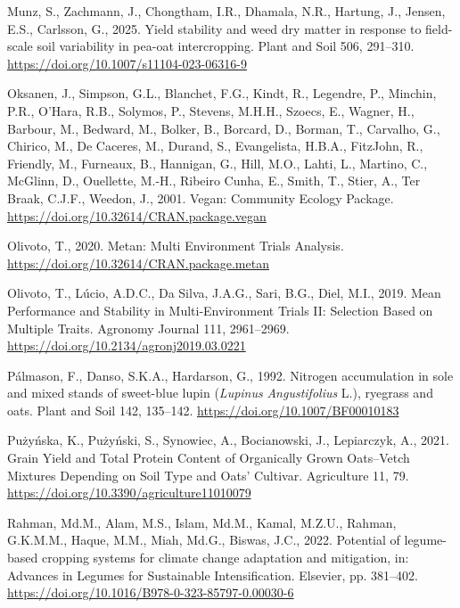 \documentclass[
  british,
  a4paper,
  DIV=11,
  numbers=noendperiod]{scrreprt}
\newlength{\cslhangindent}
\newenvironment{CSLReferences}[2] %
 {\begin{list}{}{%
  \setlength{\itemindent}{0pt}
  \setlength{\leftmargin}{0pt}
  \setlength{\parsep}{0pt}
  \ifodd #1
   \setlength{\leftmargin}{\cslhangindent}
   \setlength{\itemindent}{-1\cslhangindent}
  \fi
  \setlength{\itemsep}{#2\baselineskip}}}
 {\end{list}}
\begin{document}
\begin{CSLReferences}{1}{0}
Munz, S., Zachmann, J., Chongtham, I.R., Dhamala, N.R., Hartung, J.,
Jensen, E.S., Carlsson, G., 2025. Yield stability and weed dry matter in
response to field-scale soil variability in pea-oat intercropping. Plant
and Soil 506, 291--310. \url{https://doi.org/10.1007/s11104-023-06316-9}

Oksanen, J., Simpson, G.L., Blanchet, F.G., Kindt, R., Legendre, P.,
Minchin, P.R., O'Hara, R.B., Solymos, P., Stevens, M.H.H., Szoecs, E.,
Wagner, H., Barbour, M., Bedward, M., Bolker, B., Borcard, D., Borman,
T., Carvalho, G., Chirico, M., De Caceres, M., Durand, S., Evangelista,
H.B.A., FitzJohn, R., Friendly, M., Furneaux, B., Hannigan, G., Hill,
M.O., Lahti, L., Martino, C., McGlinn, D., Ouellette, M.-H., Ribeiro
Cunha, E., Smith, T., Stier, A., Ter Braak, C.J.F., Weedon, J., 2001.
Vegan: {Community Ecology Package}.
\url{https://doi.org/10.32614/CRAN.package.vegan}

Olivoto, T., 2020. Metan: {Multi Environment Trials Analysis}.
\url{https://doi.org/10.32614/CRAN.package.metan}

Olivoto, T., Lúcio, A.D.C., Da Silva, J.A.G., Sari, B.G., Diel, M.I.,
2019. Mean {Performance} and {Stability} in {Multi}-{Environment Trials
II}: {Selection Based} on {Multiple Traits}. Agronomy Journal 111,
2961--2969. \url{https://doi.org/10.2134/agronj2019.03.0221}

Pálmason, F., Danso, S.K.A., Hardarson, G., 1992. Nitrogen accumulation
in sole and mixed stands of sweet-blue lupin ({\emph{Lupinus}}{
\emph{Angustifolius}} {L}.), ryegrass and oats. Plant and Soil 142,
135--142. \url{https://doi.org/10.1007/BF00010183}

Pużyńska, K., Pużyński, S., Synowiec, A., Bocianowski, J., Lepiarczyk,
A., 2021. Grain {Yield} and {Total Protein Content} of {Organically
Grown Oats}--{Vetch Mixtures Depending} on {Soil Type} and {Oats}'
{Cultivar}. Agriculture 11, 79.
\url{https://doi.org/10.3390/agriculture11010079}

Rahman, Md.M., Alam, M.S., Islam, Md.M., Kamal, M.Z.U., Rahman,
G.K.M.M., Haque, M.M., Miah, Md.G., Biswas, J.C., 2022. Potential of
legume-based cropping systems for climate change adaptation and
mitigation, in: Advances in {Legumes} for {Sustainable Intensification}.
Elsevier, pp. 381--402.
\url{https://doi.org/10.1016/B978-0-323-85797-0.00030-6}


\end{CSLReferences}
\end{document}
